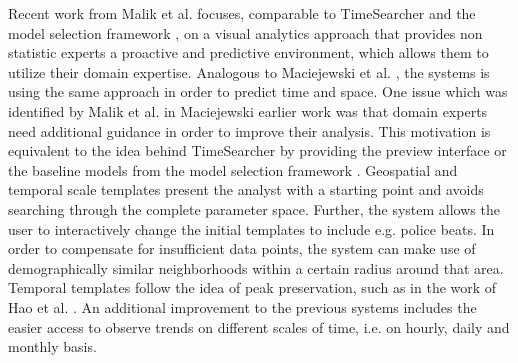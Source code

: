 \documentclass[electronic]{vgtc}             %
\begin{document}
Recent work from Malik et al. \cite{malik:2014} focuses, comparable to TimeSearcher \cite{Hochheiser:2004, buono:2007, buono:2005, Xie:2014} and the model selection framework \cite{lu:2014}, on a visual analytics approach that provides non statistic experts a proactive and predictive environment, which allows them to utilize their domain expertise.
Analogous to Maciejewski et al. \cite{maciejewski:2011, maciejewski:2010}, the systems is using the same approach in order to predict time and space.
One issue which was identified by Malik et al. in Maciejewski \cite{maciejewski:2011} earlier work was that domain experts need additional guidance in order to improve their analysis.
This motivation is equivalent to the idea behind TimeSearcher \cite{Hochheiser:2004, buono:2007, buono:2005} by providing the preview interface or the baseline models from the model selection framework \cite{lu:2014}.
Geospatial and temporal scale templates present the analyst with a starting point and avoids searching through the complete parameter space.
Further, the system allows the user to interactively change the initial templates to include e.g. police beats.
In order to compensate for insufficient data points, the system can make use of demographically similar neighborhoods within a certain radius around that area. 
Temporal templates follow the idea of peak preservation, such as in the work of Hao et al. \cite{Hao:2009, Hao:2011, Hao:2012}.
An additional improvement to the previous systems includes the easier access to observe trends on different scales of time, i.e. on hourly, daily and monthly basis.
\end{document}
